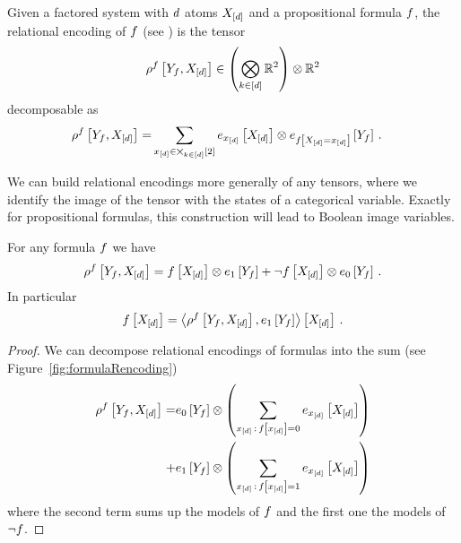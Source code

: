 Given a factored system with $d$ atoms $X_{[d]}$ and a propositional formula $f$, the relational encoding of $f$ (see ) is the tensor
	\[ \rho^{f}\left[Y_{f},X_{[d]}\right] \in  \left(\bigotimes_{k\in[d]}\mathbb{R}^2 \right) \otimes \mathbb{R}^2 \]
decomposable as
\begin{align} 
	\rho^{f}\left[Y_{f},X_{[d]}\right] 
	= & \sum_{x_{[d]}\in\bigtimes_{k\in[d]}[2]}  e_{x_{[d]}}\left[X_{[d]}\right] \otimes e_{f\left[X_{[d]}=x_{[d]}\right]}\left[Y_{f}\right] \, . 
\end{align}

We can build relational encodings more generally of any tensors, where we identify the image of the tensor with the states of a categorical variable.
Exactly for propositional formulas, this construction will lead to Boolean image variables.


\begin{lemma}\label{lem:formulaEncodingDecomposition}
	For any formula $f$ we have
		\[ \rho^{f}\left[Y_{f},X_{[d]}\right] 
		= f\left[X_{[d]}\right] \otimes e_1\left[Y_{f}\right] 
		+ \lnot f\left[X_{[d]}\right] \otimes  e_0\left[Y_{f}\right] \, . 
		 \]
	In particular
		\[ f\left[X_{[d]}\right] = \left\langle 
		\rho^{f}\left[Y_{f},X_{[d]}\right],e_1\left[Y_{f}\right]
		\right\rangle \left[ X_{[d]} \right] \, . \]
\end{lemma}
\begin{proof}
	We can decompose relational encodings of formulas into the sum (see Figure~\ref{fig:formulaRencoding}) %
	\begin{align} 
		 \rho^{f}\left[Y_{f},X_{[d]}\right]  
		 = & e_0\left[Y_{f}\right] \otimes \left( \sum_{x_{[d]}\,:\,f\left[x_{[d]}\right]=0}  e_{x_{[d]}}\left[X_{[d]}\right] \right) \\
		 + & e_1\left[Y_{f}\right] \otimes \left( \sum_{x_{[d]}\,:\,f\left[x_{[d]}\right]=1}  e_{x_{[d]}}\left[X_{[d]}\right] \right)
	\end{align}
	where the second term sums up the models of $f$ and the first one the models of $\lnot f$.
\end{proof}


